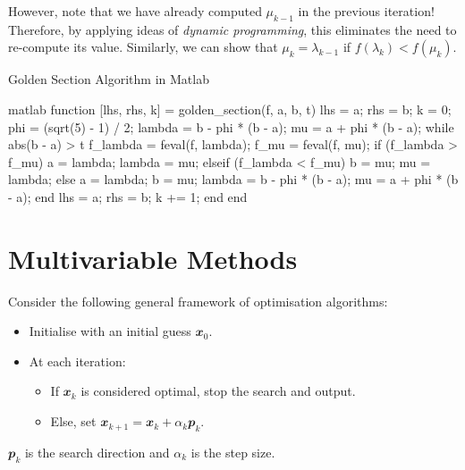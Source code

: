 \documentclass[math, code]{amznotes}
\theoremstyle{remark}
\begin{document}
However, note that we have already computed $\mu_{k - 1}$ in the previous iteration! Therefore, by applying ideas of \textit{dynamic programming}, this eliminates the need to re-compute its value. Similarly, we can show that $\mu_k = \lambda_{k - 1}$ if $f(\lambda_k) < f(\mu_k)$.
\begin{codebox}{Golden Section Algorithm in Matlab}{}
    \begin{amzcode}{matlab}
function [lhs, rhs, k] = golden_section(f, a, b, t)
    lhs = a;
    rhs = b;
    k = 0;
    phi = (sqrt(5) - 1) / 2;
    lambda = b - phi * (b - a);
    mu = a + phi * (b - a);
    while abs(b - a) > t
        f_lambda = feval(f, lambda);
        f_mu = feval(f, mu);
        if (f_lambda > f_mu) 
            a = lambda;
            lambda = mu;
        elseif (f_lambda < f_mu)
            b = mu;
            mu = lambda;
        else
            a = lambda;
            b = mu;
            lambda = b - phi * (b - a);
            mu = a + phi * (b - a);
        end
        lhs = a;
        rhs = b;
        k += 1;
    end
end
    \end{amzcode}
\end{codebox}
\section{Multivariable Methods}
Consider the following general framework of optimisation algorithms:
\begin{itemize}
    \item Initialise with an initial guess $\mathbfit{x}_0$.
    \item At each iteration:
        \begin{itemize}
            \item If $\mathbfit{x}_k$ is considered optimal, stop the search and output.
            \item Else, set $\mathbfit{x}_{k + 1} = \mathbfit{x}_k + \alpha_k\mathbfit{p}_k$.
        \end{itemize}
\end{itemize}
$\mathbfit{p}_k$ is the search direction and $\alpha_k$ is the step size.
\end{document}
